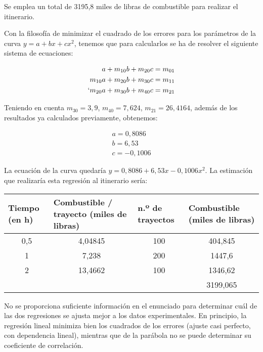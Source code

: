 Se emplea un total de 3195,8 miles de libras de combustible para realizar el itinerario.

\subproblem

Con la filosofía de minimizar el cuadrado de los errores para los parámetros de la curva $y = a +bx+cx^2$, tenemos que para calcularlos se ha de resolver el siguiente sistema de ecuaciones:

\begin{eqnarray}
\nonumber
a+ m_{10}b + m_{20}c = m_{01} \\
\nonumber
m_{10}a +m_{20}b + m_{30}c = m_{11} \\
\nonumber`
m_{20}a +m_{30}b + m_{40}c = m_{21}
\end{eqnarray}

Teniendo en cuenta $m_{30} = 3,9$, $m_{40}=7,624$, $m_{21} = 26,4164$, además de los resultados ya calculados previamente, obtenemos: 

\begin{eqnarray}
\nonumber
a=0,8086 \\
\nonumber
b=6,53 \\
\nonumber
c=-0,1006
\end{eqnarray}

La ecuación de la curva quedaría $y=0,8086+6,53x-0,1006x^2$. La estimación que realizaría esta regresión al itinerario sería:
\tiny
	\begin{center}
		\begin{tabular}{|c|c|c|c|}
			\hline
			\multicolumn{1}{|l|}{Tiempo (en h)} & \multicolumn{1}{l|}{Combustible / trayecto (miles de libras)} & \multicolumn{1}{l|}{n.º de trayectos} & \multicolumn{1}{l|}{Combustible (miles de libras)} \\ \hline
			0,5 & 4,04845 & 100 & 404,845 \\ 
			1 & 7,238 & 200 & 1447,6 \\ 
			2 & 13,4662 & 100 & 1346,62 \\ \hline
			\multicolumn{1}{|l|}{} & \multicolumn{1}{l|}{} &  & 3199,065 \\ \hline
		\end{tabular}
	\end{center}
\normalsize


\subproblem

No se proporciona suficiente información en el enunciado para determinar cuál de las dos regresiones se ajusta mejor a los datos experimentales. En principio, la regresión lineal minimiza bien los cuadrados de los errores (ajuste casi perfecto, con dependencia lineal), mientras que de la parábola no se puede determinar su coeficiente de correlación. 